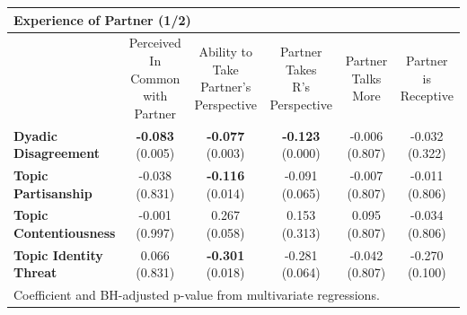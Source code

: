\begin{tabular}{lccccc}
\hline
\multicolumn{6}{l}{\textbf{Experience of Partner (1/2)}} \\
\hline
 & \makecell{Perceived In\\ Common with\\ Partner} & \makecell{Ability to Take\\ Partner's\\ Perspective} & \makecell{Partner Takes\\ R's Perspective} & \makecell{Partner Talks\\ More} & \makecell{Partner is\\ Receptive} \\
\hline
\textbf{Dyadic Disagreement} & \makecell{\textbf{-0.083}\\(0.005)} & \makecell{\textbf{-0.077}\\(0.003)} & \makecell{\textbf{-0.123}\\(0.000)} & \makecell{-0.006\\(0.807)} & \makecell{-0.032\\(0.322)} \\
\textbf{Topic Partisanship} & \makecell{-0.038\\(0.831)} & \makecell{\textbf{-0.116}\\(0.014)} & \makecell{-0.091\\(0.065)} & \makecell{-0.007\\(0.807)} & \makecell{-0.011\\(0.806)} \\
\textbf{Topic Contentiousness} & \makecell{-0.001\\(0.997)} & \makecell{0.267\\(0.058)} & \makecell{0.153\\(0.313)} & \makecell{0.095\\(0.807)} & \makecell{-0.034\\(0.806)} \\
\textbf{Topic Identity Threat} & \makecell{0.066\\(0.831)} & \makecell{\textbf{-0.301}\\(0.018)} & \makecell{-0.281\\(0.064)} & \makecell{-0.042\\(0.807)} & \makecell{-0.270\\(0.100)} \\
\hline
\multicolumn{6}{l}{\footnotesize Coefficient and BH-adjusted p-value from multivariate regressions.} \\
\end{tabular}
